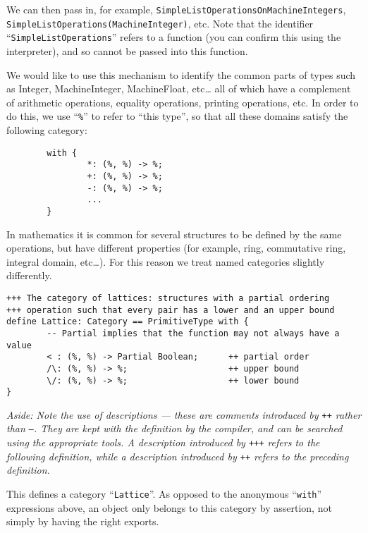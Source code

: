 \documentclass{article}
\begin{document}
We can then pass in, for example,
{\tt Sim\-ple\-List\-Opera\-tions\-On\-Ma\-chi\-ne\-Int\-e\-gers},
{\tt Sim\-ple\-List\-Op\-era\-tions(Ma\-chi\-ne\-Int\-eger)}, etc.  Note that
the identifier 
``{\tt Simple\-List\-Opera\-tions}'' refers to a function (you can confirm this
using the interpreter), and so cannot be passed into this function.

We would like to use this mechanism to identify the common parts of
types such as Integer, MachineInteger, MachineFloat, etc\dots
all of which have a
complement of arithmetic operations, equality operations,
printing operations, etc.  In order to do this, we use ``\verb!%!'' to
refer to ``this type'', so that all these domains satisfy the
following category:
\begin{small}
\begin{verbatim}
        with {
                *: (%, %) -> %;
                +: (%, %) -> %;
                -: (%, %) -> %;
                ...
        }
\end{verbatim}
\end{small}
        
In mathematics it is common for several structures to be defined by
the same operations, but have different properties (for example, ring,
commutative ring, integral domain, etc\dots).  For this reason we treat
named categories slightly differently.

\begin{small}
\begin{verbatim}
+++ The category of lattices: structures with a partial ordering
+++ operation such that every pair has a lower and an upper bound
define Lattice: Category == PrimitiveType with {
        -- Partial implies that the function may not always have a value
        < : (%, %) -> Partial Boolean;      ++ partial order
        /\: (%, %) -> %;                    ++ upper bound
        \/: (%, %) -> %;                    ++ lower bound
}
\end{verbatim}
\end{small}

{\em Aside: Note the use of descriptions --- these are comments
introduced by {\tt ++} rather than {\tt --}.  They are kept with the
definition by the compiler, and can be searched using the appropriate
tools.  A description introduced by {\tt +++} refers to the following
definition, while a description introduced by {\tt ++} refers to the
preceding definition.}

This defines a category ``{\tt Lattice}''. As opposed to the
anonymous ``{\tt with}'' expressions above, an object only belongs to this
category by assertion, not simply by having the right exports.
\end{document}
